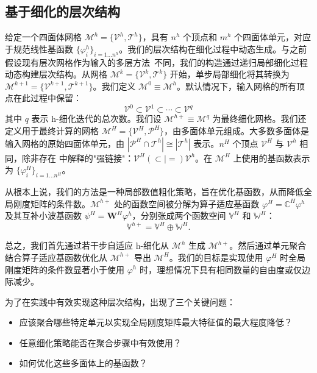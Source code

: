 \subsection{基于细化的层次结构}

给定一个四面体网格 $\mathcal{M}^h = \{\mathcal{V}^h, \mathcal{T}^h\}$，具有 $n^h$ 个顶点和 $m^h$ 个四面体单元，对应于规范线性基函数 $\{\varphi^h_i\}_{i=1\dots n^h}$。我们的层次结构在细化过程中动态生成。与之前假设现有层次网格作为输入的多层方法~\cite{chen2018numerical, chen2019material}不同，我们的构造通过递归局部细化过程动态构建层次结构。从网格 $\mathcal{M}^k = \{\mathcal{V}^{k}, \mathcal{T}^k\}$ 开始，单步局部细化将其转换为 $\mathcal{M}^{k+1} = \{\mathcal{V}^{k+1},
\mathcal{T}^{k+1}\}$。我们定义 $\mathcal{M}^0 \equiv \mathcal{M}^h$。默认情况下，输入网格的所有顶点在此过程中保留：
\begin{equation}
  \mathcal{V}^0 \subset \mathcal{V}^1 \subset \cdots \subset \mathcal{V}^q
\end{equation}
其中 $q$ 表示 h-细化迭代的总次数。我们设 $\mathcal{M}^{h+}\equiv\mathcal{M}^q$ 为最终细化网格。我们还定义用于最终计算的网格 $\mathcal{M}^H = \{\mathcal{V}^H, \mathcal{P}^H \}$，由多面体单元组成。大多数多面体是输入网格的原始四面体单元，由 $|\mathcal{P}^H \cap \mathcal{T}^h| \cong
|\mathcal{T}^h|$ 表示。$n^H$ 个顶点 $\mathcal{V}^H$ 与 $\mathcal{V}^h$ 相同，除非存在  中解释的"强链接"：$\mathcal{V}^H (\subset | = ) \mathcal{V}^h$。在 $\mathcal{M}^H$ 上使用的基函数表示为 $\{\varphi_i^H\}_{i=1\dots n^H}$。

从根本上说，我们的方法是一种局部数值粗化策略，旨在优化基函数，从而降低全局刚度矩阵的条件数。$\mathcal{M}^{h+}$ 处的函数空间被分解为算子适应基函数 $\varphi^H = \mathbb{C}^H\varphi^h$ 及其互补小波基函数 $\psi^H = \mathbf{W}^H \varphi^h$，分别张成两个函数空间 $\mathbb{V}^H$ 和 $\mathbb{W}^H$：
\begin{equation}
  \mathbb{V}^{h+} = \mathbb{V}^H \oplus \mathbb{W}^H.
  \label{eq:two-level-functiaonal-space}
\end{equation}

总之，我们首先通过若干步自适应 h-细化从 $\mathcal{M}^h$ 生成 $\mathcal{M}^{h+}$。然后通过单元聚合结合算子适应基函数优化从 $\mathcal{M}^{h+}$ 导出 $\mathcal{M}^H$。我们的目标是实现使用 $\varphi^H$ 时全局刚度矩阵的条件数显著小于使用 $\varphi^h$ 时，理想情况下具有相同数量的自由度或仅边际减少。

为了在实践中有效实现这种层次结构，出现了三个关键问题：
\begin{itemize}
\item 应该聚合哪些特定单元以实现全局刚度矩阵最大特征值的最大程度降低？
\item 任意细化策略能否在聚合步骤中有效使用？
\item 如何优化这些多面体上的基函数？
\end{itemize}

